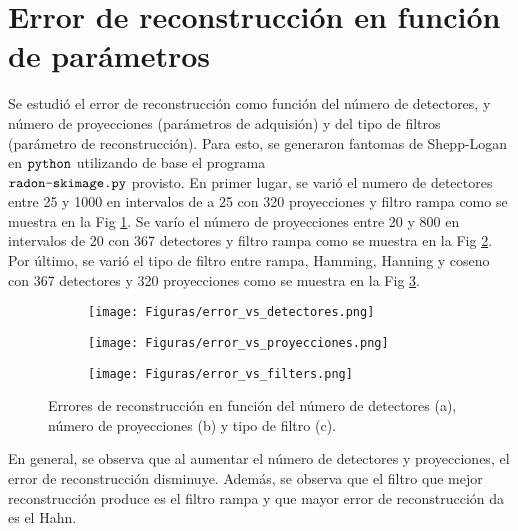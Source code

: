 \documentclass[letterpaper,12pt]{article}
\theoremstyle{plain}
\begin{document}
\section{Error de reconstrucción en función de parámetros}

Se estudió el error de reconstrucción como función del número de detectores, y número de proyecciones (parámetros de adquisión) y del tipo de filtros (parámetro de reconstrucción). Para esto, se generaron fantomas de Shepp-Logan en $\verb|python|$ utilizando de base el programa \\$\verb|radon-skimage.py|$ provisto. En primer lugar, se varió el numero de detectores entre 25 y 1000 en intervalos de a 25 con 320 proyecciones y filtro rampa como se muestra en la Fig \ref{fig:err_det}. Se varío el número de proyecciones entre 20 y 800 en intervalos de 20 con 367 detectores y filtro rampa como se muestra en la Fig \ref{fig:err_proy}. Por último, se varió el tipo de filtro entre rampa, Hamming, Hanning y coseno con 367 detectores y 320 proyecciones como se muestra en la Fig \ref{fig:err_filtro}.

\begin{figure}[H]
   \centering
        \begin{subfigure}[h]{0.32\linewidth}
           \centering
           \texttt{[image: Figuras/error\_vs\_detectores.png]}
           \caption{} 
           \label{fig:err_det}
        \end{subfigure}
        \begin{subfigure}[h]{0.32\linewidth}
           \centering
           \texttt{[image: Figuras/error\_vs\_proyecciones.png]}
           \caption{}
           \label{fig:err_proy}
        \end{subfigure}
        \begin{subfigure}[h]{0.32\linewidth}
         \centering
         \texttt{[image: Figuras/error\_vs\_filters.png]}
         \caption{}
         \label{fig:err_filtro}
      \end{subfigure}
   \caption{Errores de reconstrucción en función del número de detectores (a), número de proyecciones (b) y tipo de filtro (c).}
   \label{fig:err_vs_param}
\end{figure}

En general, se observa que al aumentar el número de detectores y proyecciones, el error de reconstrucción disminuye. Además, se observa que el filtro que mejor reconstrucción produce es el filtro rampa y que mayor error de reconstrucción da es el Hahn.
\end{document}
